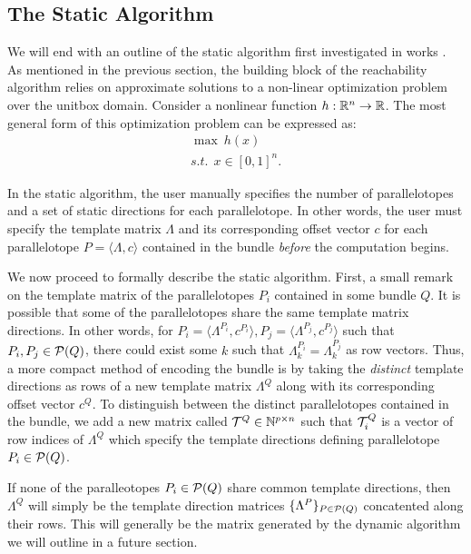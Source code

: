 \subsection{The Static Algorithm}
\label{sec:static}

We will end with an outline of the static algorithm first investigated in works \cite{dang2012reachability, dreossi2016parallelotope}. As mentioned in the previous section, the building block of the reachability algorithm relies on approximate solutions to a non-linear optimization problem over the unitbox domain. Consider a nonlinear function $h : {\mathbb{R}}^n \rightarrow {\mathbb{R}}$. The most general form of this optimization problem can be expressed as:
%
\begin{eqnarray}
  \max ~ h(x) \label{eq:maxsup}\\
  s.t. ~~ x \in [0,1]^{n}.\nonumber
\end{eqnarray}

In the static algorithm, the user manually specifies the number of parallelotopes and a set of static directions for each parallelotope. In other words, the user must specify the template matrix $\Lambda$ and its corresponding offset vector $c$ for each parallelotope $P = \langle \Lambda, c\rangle$ contained in the bundle \emph{before} the computation begins.

We now proceed to formally describe the static algorithm.
%
First, a small remark on the template matrix of the parallelotopes $P_i$ contained in some bundle $Q$. It is possible that some of the parallelotopes share the same template matrix directions.
%
 In other words, for $P_i = \langle \Lambda^{P_i}, c^{P_i} \rangle, P_j = \langle \Lambda^{P_j}, c^{P_j} \rangle$ such that $P_i, P_j \in \mathcal{P}(Q)$, there could exist some $k$ such that $\Lambda^{P_i}_k = \Lambda^{P_j}_k$ as row vectors.
%
Thus, a more compact method of encoding the bundle is by taking the \emph{distinct} template directions as rows of a new template matrix $\Lambda^Q$ along with its corresponding offset vector $c^Q$.
%
To distinguish between the distinct parallelotopes contained in the bundle, we add a new matrix called $\mathcal{T}^Q \in \mathbb{N}^{p \times n}$ such that $\mathcal{T}^Q_i$ is a vector of row indices of $\Lambda^Q$ which specify the template directions defining parallelotope $P_i \in \mathcal{P}(Q)$.
%
\begin{remark}
If none of the paralleotopes $P_i \in \mathcal{P}(Q)$ share common template directions, then $\Lambda^Q$ will simply be the template direction matrices $\{\Lambda^P\}_{P \in \mathcal{P}(Q)}$ concatented along their rows. This will generally be the matrix generated by the dynamic algorithm we will outline in a future section.
\end{remark}
%
\begin{example}

\end{example}

